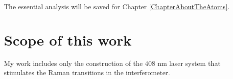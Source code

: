 
The essential analysis will be saved for Chapter \ref{ChapterAboutTheAtoms}.




\section{Scope of this work}
My work includes only the construction of the 408 nm laser system that stimulates the Raman transitions in the interferometer. 

